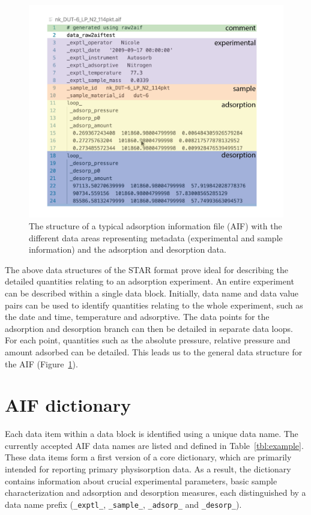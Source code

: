 \documentclass[journal=langd5,manuscript=article]{achemso}
\begin{document}
  
  \begin{figure}[htb]
    \includegraphics{./figures/structure-01.png}
      \caption{The structure of a typical adsorption information file (AIF) with the different data areas representing metadata (experimental and sample information) and the adsorption and desorption data.}
      \label{fgr:datastructure}
    \end{figure}


The above data structures of the STAR format prove ideal for describing the detailed quantities relating to an adsorption experiment.
An entire experiment can be described within a single data block.
Initially, data name and data value pairs can be used to identify quantities relating to the whole experiment, such as the date and time, temperature and adsorptive.
The data points for the adsorption and desorption branch can then be detailed in separate data loops.
For each point, quantities such as the absolute pressure, relative pressure and amount adsorbed can be detailed.
This leads us to the general data structure for the AIF (Figure~\ref{fgr:datastructure}).


\section{AIF dictionary}
Each data item within a data block is identified using a unique data name.
The currently accepted AIF data names are listed and defined in Table~\ref{tbl:example}.
These data items form a first version of a core dictionary, which are primarily intended for reporting primary physisorption data.
As a result, the dictionary contains information about crucial experimental parameters, basic sample characterization and adsorption and desorption measures, each distinguished by a data name prefix (\texttt{\_exptl\_}, \texttt{\_sample\_}, \texttt{\_adsorp\_} and \texttt{\_desorp\_}).
\end{document}
